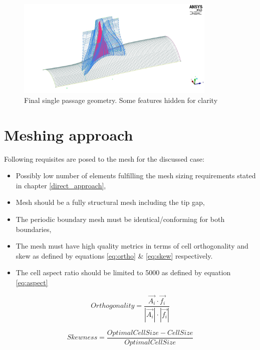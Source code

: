 \begin{figure}[h!]
\centering %
\includegraphics[width=0.85\textwidth]{Pictures/r67_geom.jpg}
\caption{Final single passage geometry. Some features hidden for clarity}
\label{geom_final}
\end{figure}

\section{Meshing approach} \label{mesh}
Following requisites are posed to the mesh for the discussed case:
\begin{itemize}
\item Possibly low number of elements fulfilling the mesh sizing requirements stated in chapter \ref{direct_approach},
\item Mesh should be a fully structural mesh including the tip gap,
\item The periodic boundary mesh must be identical/conforming for both boundaries,
\item The mesh must have high quality metrics in terms of cell orthogonality and skew as defined by equations \ref{eq:ortho} \& \ref{eq:skew} respectively.
\item The cell aspect ratio should be limited to 5000 as defined by equation \ref{eq:aspect} 
\end{itemize}


\begin{equation} \label{eq:ortho}
Orthogonality = \frac{\vec{A_i} \cdot \vec{f_i}}{|\vec{A_i}| \cdot |\vec{f_i}|}
\end{equation}


\begin{equation} \label{eq:skew}
Skewness = \frac{Optimal Cell Size - Cell Size}{Optimal Cell Size}
\end{equation}

